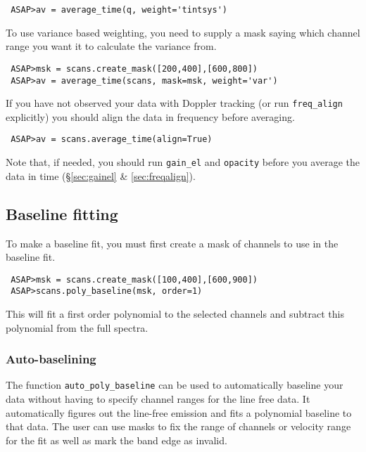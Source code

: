 \documentclass[11pt]{article}
\newcommand{\cmd}[1]{{\tt #1}}
\begin{document}
\begin{verbatim}
 ASAP>av = average_time(q, weight='tintsys')
\end{verbatim}

To use variance based weighting, you need to supply a mask saying which
channel range you want it to calculate the variance from.

\begin{verbatim}
 ASAP>msk = scans.create_mask([200,400],[600,800])
 ASAP>av = average_time(scans, mask=msk, weight='var')
\end{verbatim}

If you have not observed your data with Doppler tracking (or run
\cmd{freq\_align} explicitly) you should align the data in frequency
before averaging.

\begin{verbatim}
 ASAP>av = scans.average_time(align=True)
\end{verbatim}

Note that, if needed, you should run \cmd{gain\_el} and \cmd{opacity}
before you average the data in time (\S \ref{sec:gainel} \&
\ref{sec:freqalign}).

\subsection{Baseline fitting}

To make a baseline fit, you must first create
a mask of channels to use in the baseline fit.

\begin{verbatim}
 ASAP>msk = scans.create_mask([100,400],[600,900])
 ASAP>scans.poly_baseline(msk, order=1)
\end{verbatim}

This will fit a first order polynomial to the selected channels and subtract
this polynomial from the full spectra.

\subsubsection{Auto-baselining}

The function \cmd{auto\_poly\_baseline} can be used to automatically
baseline your data without having to specify channel ranges for the
line free data. It automatically figures out the line-free emission
and fits a polynomial baseline to that data. The user can use masks to
fix the range of channels or velocity range for the fit as well as
mark the band edge as invalid.
\end{document}
